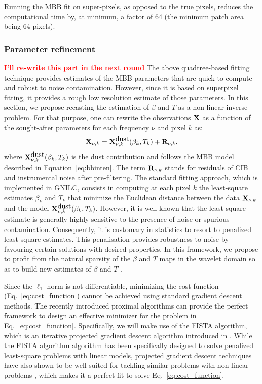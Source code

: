 \documentclass[a4paper,fleqn,usenatbib]{mnras}
\newcommand{\jbc}[1]{\textcolor{Red}{\bf #1}}
\begin{document}
Running the MBB fit on super-pixels, as opposed to the true pixels, reduces the computational time by, at minimum, a factor of 64 (the minimum patch area being 64 pixels).  

\subsubsection{Parameter refinement} \label{parref}
\jbc{I'll re-write this part in the next round}
The above quadtree-based fitting technique provides estimates of the MBB parameters that are quick to compute and robust to noise contamination. However, since it is based on superpixel fitting, it provides a rough low resolution estimate of those parameters. In this section, we propose recasting the estimation of $\beta$ and $T$ as a non-linear inverse problem. For that purpose, one can rewrite the observations $\bf X$ as a function of the sought-after parameters for each frequency $\nu$ and pixel $k$ as:
\begin{eqnarray}
{\bf X}_{\nu,k} = {\bf X}_{\nu,k}^{\mbox{dust}}(\beta_k,T_k) + {\bf R}_{\nu,k},
\end{eqnarray}
where ${\bf X}_{\nu,k}^{\mbox{dust}}(\beta_k,T_k)$ is the dust contribution and follows the MBB model described in Equation~\ref{eq:bbinten}. The term ${\bf R}_{\nu,k}$ stands for residuals of CIB and instrumental noise after pre-filtering. The standard fitting approach, which is implemented in GNILC, consists in computing at each pixel $k$ the least-square estimates $\beta_k$ and $T_k$ that minimize the Euclidean distance between the data ${\bf X}_{\nu,k}$ and the model ${\bf X}_{\nu,k}^{\mbox{dust}}(\beta_k,T_k)$. However, it is well-known that the least-square estimate is generally highly sensitive to the presence of noise or spurious contamination. Consequently, it is customary in statistics to resort to penalized least-square estimates. This penalisation provides robustness to noise by favouring certain solutions with desired properties. In this framework, we propose to profit from the natural sparsity of the $\beta$ and $T$ maps in the wavelet domain so as to build new estimates of $\beta$ and $T$ \citep{starckBook}.

Since the $\ell_1$ norm is not differentiable, minimizing the cost function (Eq.~\ref{eq:cost_function}) cannot be achieved using standard gradient descent methods. The recently introduced proximal algorithms \citep{parikh2014proximal} can provide the perfect framework to design an effective minimizer for the problem in Eq.~\ref{eq:cost_function}. Specifically, we will make use of the FISTA algorithm, which is an iterative projected gradient descent algorithm introduced in \citet{beck2009fast}. While the FISTA algorithm algorithm has been specifically designed to solve penalized least-square problems with linear models, projected gradient descent techniques have also shown to be well-suited for tackling similar problems with non-linear problems \cite{teschke09}, which makes it a perfect fit to solve Eq.~\ref{eq:cost_function}.
\end{document}
